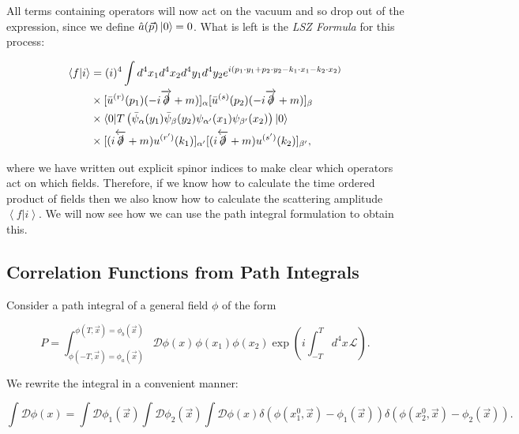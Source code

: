All terms containing operators will now act on the vacuum and so drop out of the expression, since we define $\hat{a}(\vec{p}) \mathinner{\lvert0\rangle}_{\hspace{-0.1em}} = 0$. What is left is the \emph{LSZ Formula} for this process:

\begin{equation}
\label{LSZform}
\begin{split}
\left<f | i\right> &= (i)^4 \int d^4 x_1 d^4 x_2 d^4 y_1 d^4 y_2 e^{i(p_1 \cdot y_1 + p_2 \cdot y_2 - k_1 \cdot x_1 - k_2 \cdot x_2)} \\
&\times  [\bar{u}^{(r)}(p_1)(- i \overrightarrow{\slashed{\partial}} + m)]_\alpha [\bar{u}^{(s)}(p_2)(- i \overrightarrow{\slashed{\partial}} + m)]_\beta \\
& \times \mathinner{\langle0\vert T \left(\bar{\psi}_\alpha(y_1) \bar{\psi}_\beta(y_2) \psi_{\alpha'}(x_1) \psi_{\beta'}(x_2) \right)\vert0\rangle}_{} \\
& \times [(i \overleftarrow{\slashed{\partial}} + m)u^{(r')}(k_1)]_{\alpha' }[(i \overleftarrow{\slashed{\partial}} + m)u^{(s')}(k_2)]_{\beta'},
\end{split}
\end{equation}

where we have written out explicit spinor indices to make clear which operators act on which fields. Therefore, if we know how to calculate the time ordered product of fields then we also know how to calculate the scattering amplitude $\left<f | i \right>$.  We will now see how we can use the path integral formulation to obtain this.

\subsection{Correlation Functions from Path Integrals}

Consider a path integral of a general field $\phi$ of the form

\begin{equation}
P = \int^{\phi(T, \vec{x}) = \phi_b(\vec{x})}_{\phi(-T, \vec{x}) = \phi_a(\vec{x})} \mathcal{D} \phi(x) \hspace{1pt}  \phi(x_1) \phi(x_2) \exp \left( i \int_{-T}^T d^4 x \hspace{1pt} \mathscr{L} \right).
\end{equation}

We rewrite the integral in a convenient manner:

\begin{equation}
\int \mathcal{D} \phi(x) = \int \mathcal{D}\phi_1(\vec{x}) \int \mathcal{D} \phi_2 (\vec{x}) \int \mathcal{D} \phi(x) \delta(\phi(x_1^0, \vec{x}) - \phi_1(\vec{x})) \delta(\phi(x_2^0, \vec{x}) - \phi_2(\vec{x})).
\end{equation}

